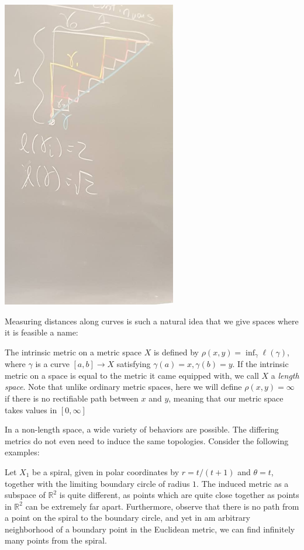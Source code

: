 \documentclass[12pt]{amsart}
\begin{document}
\begin{center}
  \includegraphics[width=3in]{2018-08-24}
\end{center}

Measuring distances along curves is such a natural idea that we give spaces where it is feasible a name:

\begin{definition}
The intrinsic metric on a metric space $X$ is defined by $\rho(x,y) = \inf_\gamma \ell(\gamma)$, where $\gamma$ is a curve $[a,b] \to X$ satisfying $\gamma(a) = x, \gamma(b) = y$.  If the intrinsic metric on a space is equal to the metric it came equipped with, we call $X$ a \textit{length space}. Note that unlike ordinary metric spaces, here we will define $\rho(x,y) = \infty$ if there is no rectifiable path between $x$ and $y$, meaning that our metric space takes values in $[ 0, \infty ]$
\end{definition}

In a non-length space, a wide variety of behaviors are possible. The differing metrics do not even need to induce the same topologies. Consider the following examples:

\begin{example}
Let $X_1$ be a spiral, given in polar coordinates by $r = t/(t+1)$ and $\theta = t$, together with the limiting boundary circle of radius $1$. The induced metric as a subspace of $\mathbb{R}^2$ is quite different, as points which are quite close together as points in $\mathbb{R}^2$ can be extremely far apart. Furthermore, observe that there is no path from a point on the spiral to the boundary circle, and yet in am arbitrary neighborhood of a boundary point in the Euclidean metric, we can find infinitely many points from the spiral.
\end{example}
\end{document}
